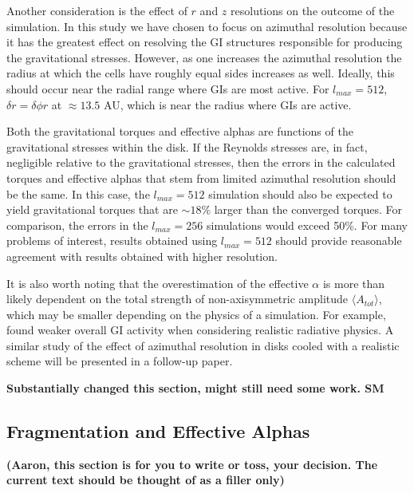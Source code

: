 \documentclass[manuscript]{aastex}
\begin{document}
Another consideration is the effect of $r$ and $z$ resolutions on the outcome of the simulation. In this study we have chosen to focus on azimuthal resolution because it has the greatest effect on resolving the GI structures responsible for producing the gravitational stresses. However, as one increases the azimuthal resolution the radius at which the cells have roughly equal sides increases as well. Ideally, this should occur near the radial range where GIs are most active. For $l_{max} = 512$, $\delta r = \delta \phi r$ at $\approx 13.5$ AU, which is near the radius where GIs are active.

Both the gravitational torques and effective alphas are functions of the
gravitational stresses within the disk.  If the Reynolds stresses are, in fact, negligible relative to the gravitational stresses,
then the errors in the calculated torques and effective alphas that stem from limited azimuthal resolution 
should be the same. In this case, the  $l_{max} = 512$ simulation should also be expected to yield
gravitational torques that are $\sim 18$\% larger than the converged torques.  For comparison, the
errors in the $l_{max} = 256$ simulations would exceed 50\%. For many problems of interest,
results obtained using $l_{max} = 512$ should provide reasonable agreement with results obtained 
with higher resolution. 

It is also worth noting that the overestimation of the effective $\alpha$ is more than likely dependent on the total strength of non-axisymmetric amplitude $\langle A_{tot} \rangle$, which may be smaller depending on the physics of a simulation. For example, \citet{boley2006} found weaker overall GI activity when considering realistic radiative physics. A similar study of the effect of azimuthal resolution in disks cooled with a realistic scheme will be presented in a follow-up paper. 

{\bf Substantially changed this section, might still need some work. SM} 

\subsection{Fragmentation and Effective Alphas}

\noindent
{\bf (Aaron, this section is for you to write or toss, your decision.  The current text should be thought of as a filler only)}
\end{document}
